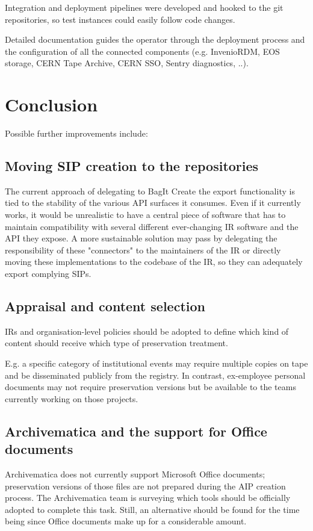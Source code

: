 \documentclass[11pt]{IEEEtran}
\begin{document}
Integration and deployment pipelines were developed and hooked to the git repositories, so test instances could easily follow code changes.

Detailed documentation guides the operator through the deployment process and the configuration of all the connected components (e.g. InvenioRDM, EOS storage, CERN Tape Archive, CERN SSO, Sentry diagnostics, ..).

\section{Conclusion}

Possible further improvements include:

\subsection{Moving SIP creation to the repositories}
The current approach of delegating to BagIt Create the export functionality is tied to the stability of the various API surfaces it consumes. Even if it currently works, it would be unrealistic to have a central piece of software that has to maintain compatibility with several different ever-changing IR software and the API they expose. A more sustainable solution may pass by delegating the responsibility of these "connectors" to the maintainers of the IR or directly moving these implementations to the codebase of the IR, so they can adequately export complying SIPs.

\subsection{Appraisal and content selection}

IRs and organisation-level policies should be adopted to define which kind of content should receive which type of preservation treatment.

E.g. a specific category of institutional events may require multiple copies on tape and be disseminated publicly from the registry. In contrast, ex-employee personal documents may not require preservation versions but be available to the teams currently working on those projects.


\subsection{Archivematica and the support for Office documents}
Archivematica does not currently support Microsoft Office documents; preservation versions of those files are not prepared during the AIP creation process.
The Archivematica team is surveying which tools should be officially adopted to complete this task. Still, an alternative should be found for the time being since Office documents make up for a considerable amount.
\end{document}
